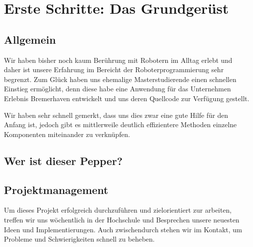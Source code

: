 \chapter{Erste Schritte: Das Grundgerüst}
\label{sec:erste-schritte-und-installation}

\section{Allgemein}
Wir haben bisher noch kaum Berührung mit Robotern im Alltag erlebt und daher ist unsere Erfahrung im Bereicht
der Roboterprogrammierung sehr begrenzt. Zum Glück haben uns ehemalige Masterstudierende einen schnellen
Einstieg ermöglicht, denn diese habe eine Anwendung für das Unternehmen \grqq{}Erlebnis Bremerhaven\grqq{}
entwickelt und uns deren Quellcode zur Verfügung gestellt.

Wir haben sehr schnell gemerkt, dass uns dies zwar eine gute Hilfe für den Anfang ist, jedoch gibt es mittlerweile
deutlich effizientere Methoden einzelne Komponenten miteinander zu verknüpfen.

\section{Wer ist dieser Pepper?}
%
%
%
%

\section{Projektmanagement}
Um dieses Projekt erfolgreich durchzuführen und zielorientiert zur arbeiten, treffen wir uns wöchentlich
in der Hochschule und Besprechen unsere neuesten Ideen und Implementierungen. Auch zwischendurch
stehen wir im Kontakt, um Probleme und Schwierigkeiten schnell zu beheben.

